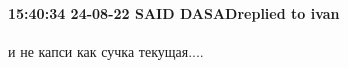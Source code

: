  
 
 
 
 

\paragraph{15:40:34 24-08-22 SAID DASADreplied to ivan}

и не капси как сучка текущая....

